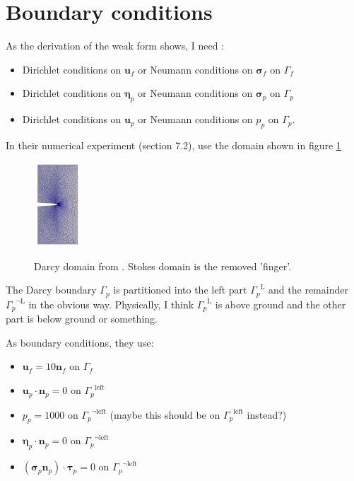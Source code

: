 \documentclass{article}
\newcommand{\mathspace}[1]{\ensuremath{#1}\xspace} %
\newcommand{\sigmabf}{\mathspace{\boldsymbol{\sigma}}}
\newcommand{\taubf}{\mathspace{\boldsymbol{\tau}}}
\newcommand{\stokesbdy}{\mathspace{\Gamma_{f}}}
\newcommand{\darcybdy}{\mathspace{\Gamma_{p}}}
\newcommand{\nf}{\mathspace{\mathbf{n}_f}}
\newcommand{\np}{\mathspace{\mathbf{n}_p}}
\newcommand{\uf}{\mathspace{\mathbf{u}_f}}
\newcommand{\up}{\mathspace{\mathbf{u}_p}}
\newcommand{\pp}{\mathspace{p_p}}
\newcommand{\disp}{\mathspace{\boldsymbol{\eta}_p}}
\begin{document}
\section{Boundary conditions}
As the derivation of the weak form shows, I need :
\begin{itemize}
\item Dirichlet conditions on \uf or Neumann conditions on
  $\sigmabf_f$ on \stokesbdy
\item Dirichlet conditions on \disp or Neumann %
  conditions on $\sigmabf_p$ on \darcybdy
\item Dirichlet conditions on
  \up or Neumann conditions on \pp on \darcybdy.
\end{itemize}


In their numerical experiment (section 7.2), \cite{ambartsumyan} use the domain shown in figure \ref{fig:ambartsumyandomain}
\begin{figure}[h]
  \centering
  \includegraphics[width=0.15\textwidth]{img/ambartsumyandomain.png}
  \label{fig:ambartsumyandomain}
  \caption{Darcy domain from \cite{ambartsumyan}. Stokes domain is the removed 'finger'.}
\end{figure}
The Darcy boundary \darcybdy is partitioned into the left part $\darcybdy^{\text{L}}$ and the remainder $\darcybdy^{\neg \text{L}}$ in the obvious way. Physically, I think $\darcybdy^{\text{L}}$ is above ground and the other part is below ground or something.

As boundary conditions, they use:
\begin{itemize}
\item $\uf = 10 \nf$ on \stokesbdy
\item $\up \cdot \np = 0$ on $\darcybdy^{\text{left}}$
\item $\pp = 1000$ on $\darcybdy^{\neg \text{left}}$ (maybe this should be on $\darcybdy^{\text{left}}$ instead?)
\item $\disp \cdot \np = 0$ on $\darcybdy^{\neg \text{left}}$
\item $(\sigmabf_p \np) \cdot \taubf_p = 0$ on $\darcybdy^{\neg \text{left}}$


 
\end{itemize}
\end{document}
